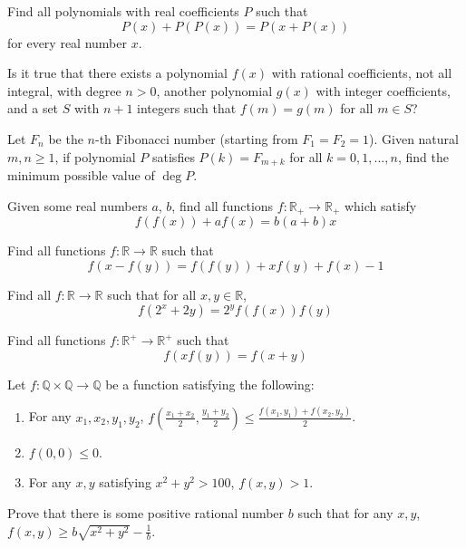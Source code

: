 


 {Find all polynomials with real coefficients $P$ such that
\[P(x) + P(P(x)) = P(x+P(x))\]
for every real number $x$.}

 {Is it true that there exists a polynomial $f(x)$ with rational coefficients, not all integral, with degree $n > 0$, another polynomial $g(x)$ with integer coefficients, and a set $S$ with $n+1$ integers such that $f(m) = g(m)$ for all $m \in S$?}

 {Let $F_n$ be the $n$-th Fibonacci number (starting from $F_1=F_2=1$). Given natural $m,n\ge 1$, if polynomial $P$ satisfies $P(k)=F_{m+k}$ for all $k=0,1,...,n$, find the minimum possible value of $\deg P$.}




 {Given some real numbers $a$, $b$, find all functions $f: \mathbb{R}_+\rightarrow\mathbb{R}_+$ which satisfy
\[f(f(x))+af(x)=b(a+b)x\]}

 {Find all functions $f: \mathbb{R}\rightarrow\mathbb{R}$ such that
\[f(x-f(y))=f(f(y))+xf(y)+f(x)-1\]}

 {Find all $f:\mathbb{R}\rightarrow \mathbb{R}$ such that for all $x,y\in\mathbb{R}$,
$$f(2^x+2y) = 2^yf(f(x))f(y)$$}



 {Find all functions $f: \mathbb{R^+}\rightarrow\mathbb{R^+}$ such that
\[f(xf(y)) = f(x+y)\]}

 {Let $f:\mathbb{Q}\times\mathbb{Q}\rightarrow\mathbb{Q}$ be a function satisfying the following:
\begin{enumerate}
    \item For any $x_1,x_2,y_1,y_2$, $f(\frac{x_1+x_2}{2},\frac{y_1+y_2}{2}) \le \frac{f(x_1,y_1)+f(x_2,y_2)}{2}$.
    \item $f(0,0) \le 0$.
    \item For any $x,y$ satisfying $x^2+y^2>100$, $f(x,y)>1$.
\end{enumerate}
Prove that there is some positive rational number $b$ such that for any $x,y$, $f(x,y) \ge b\sqrt{x^2+y^2} - \frac{1}{b}$.}


